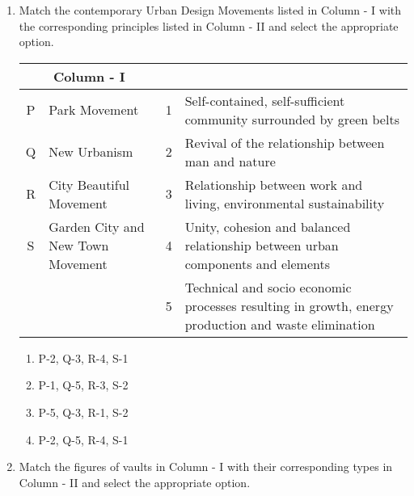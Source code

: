 \documentclass[12pt]{article}
\begin{document}
\begin{enumerate}[label=Q.\arabic*,start=26]
	\item Match the contemporary Urban Design Movements listed in Column - I with the corresponding principles listed in Column - II and select the appropriate option.
		\begin{center}
			\begin{tabular}{|c|>{\raggedright\arraybackslash}p{5cm}|c|>{\raggedright\arraybackslash}p{6cm}|}
				\hline
				\multicolumn{2}{|c|}{\textbf{Column - I}} & \multicolumn{2}{c|}{\textbf{Column - II}} \\
				\hline
				P & Park Movement & 1 & Self-contained, self-sufficient community surrounded by green belts \\
				\hline
				Q & New Urbanism & 2 & Revival of the relationship between man and nature \\
				\hline
				R & City Beautiful Movement & 3 & Relationship between work and living, environmental sustainability \\
				\hline
				S & Garden City and New Town Movement & 4 & Unity, cohesion and balanced relationship between urban components and elements \\
				\hline
				& & 5 & Technical and socio economic processes resulting in growth, energy production and waste elimination \\
				\hline
			\end{tabular}
		\end{center}
		\begin{multicols}{2}
			\begin{enumerate}
				\item P-2, Q-3, R-4, S-1
				\item P-1, Q-5, R-3, S-2
				\item P-5, Q-3, R-1, S-2
				\item P-2, Q-5, R-4, S-1
			\end{enumerate}
		\end{multicols}


	\item Match the figures of vaults in Column - I with their corresponding types in Column - II and select the appropriate option.


\end{enumerate}
\end{document}
